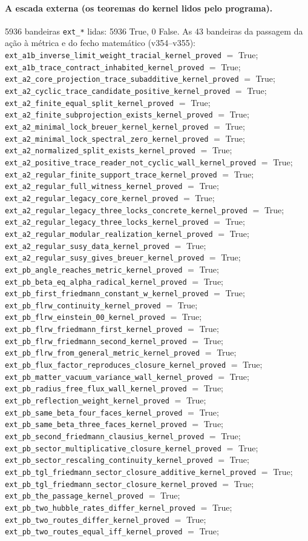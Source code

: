 \documentclass[11pt]{article}
\theoremstyle{definition}\newtheorem{deriv}{Derivação}
\begin{document}
\paragraph*{A escada externa (os teoremas do kernel lidos pelo programa).} 5936 bandeiras \texttt{ext\_*} lidas: 5936 True, 0 False. As 43 bandeiras da passagem da ação à métrica e do fecho matemático (v354--v355): \texttt{ext\_a1b\_inverse\_limit\_weight\_tracial\_kernel\_proved} $=$ True; \texttt{ext\_a1b\_trace\_contract\_inhabited\_kernel\_proved} $=$ True; \texttt{ext\_a2\_core\_projection\_trace\_subadditive\_kernel\_proved} $=$ True; \texttt{ext\_a2\_cyclic\_trace\_candidate\_positive\_kernel\_proved} $=$ True; \texttt{ext\_a2\_finite\_equal\_split\_kernel\_proved} $=$ True; \texttt{ext\_a2\_finite\_subprojection\_exists\_kernel\_proved} $=$ True; \texttt{ext\_a2\_minimal\_lock\_breuer\_kernel\_kernel\_proved} $=$ True; \texttt{ext\_a2\_minimal\_lock\_spectral\_zero\_kernel\_proved} $=$ True; \texttt{ext\_a2\_normalized\_split\_exists\_kernel\_proved} $=$ True; \texttt{ext\_a2\_positive\_trace\_reader\_not\_cyclic\_wall\_kernel\_proved} $=$ True; \texttt{ext\_a2\_regular\_finite\_support\_trace\_kernel\_proved} $=$ True; \texttt{ext\_a2\_regular\_full\_witness\_kernel\_proved} $=$ True; \texttt{ext\_a2\_regular\_legacy\_core\_kernel\_proved} $=$ True; \texttt{ext\_a2\_regular\_legacy\_three\_locks\_concrete\_kernel\_proved} $=$ True; \texttt{ext\_a2\_regular\_legacy\_three\_locks\_kernel\_proved} $=$ True; \texttt{ext\_a2\_regular\_modular\_realization\_kernel\_proved} $=$ True; \texttt{ext\_a2\_regular\_susy\_data\_kernel\_proved} $=$ True; \texttt{ext\_a2\_regular\_susy\_gives\_breuer\_kernel\_proved} $=$ True; \texttt{ext\_pb\_angle\_reaches\_metric\_kernel\_proved} $=$ True; \texttt{ext\_pb\_beta\_eq\_alpha\_radical\_kernel\_proved} $=$ True; \texttt{ext\_pb\_first\_friedmann\_constant\_w\_kernel\_proved} $=$ True; \texttt{ext\_pb\_flrw\_continuity\_kernel\_proved} $=$ True; \texttt{ext\_pb\_flrw\_einstein\_00\_kernel\_proved} $=$ True; \texttt{ext\_pb\_flrw\_friedmann\_first\_kernel\_proved} $=$ True; \texttt{ext\_pb\_flrw\_friedmann\_second\_kernel\_proved} $=$ True; \texttt{ext\_pb\_flrw\_from\_general\_metric\_kernel\_proved} $=$ True; \texttt{ext\_pb\_flux\_factor\_reproduces\_closure\_kernel\_proved} $=$ True; \texttt{ext\_pb\_matter\_vacuum\_variance\_wall\_kernel\_proved} $=$ True; \texttt{ext\_pb\_radius\_free\_flux\_wall\_kernel\_proved} $=$ True; \texttt{ext\_pb\_reflection\_weight\_kernel\_proved} $=$ True; \texttt{ext\_pb\_same\_beta\_four\_faces\_kernel\_proved} $=$ True; \texttt{ext\_pb\_same\_beta\_three\_faces\_kernel\_proved} $=$ True; \texttt{ext\_pb\_second\_friedmann\_clausius\_kernel\_proved} $=$ True; \texttt{ext\_pb\_sector\_multiplicative\_closure\_kernel\_proved} $=$ True; \texttt{ext\_pb\_sector\_rescaling\_continuity\_kernel\_proved} $=$ True; \texttt{ext\_pb\_tgl\_friedmann\_sector\_closure\_additive\_kernel\_proved} $=$ True; \texttt{ext\_pb\_tgl\_friedmann\_sector\_closure\_kernel\_proved} $=$ True; \texttt{ext\_pb\_the\_passage\_kernel\_proved} $=$ True; \texttt{ext\_pb\_two\_hubble\_rates\_differ\_kernel\_proved} $=$ True; \texttt{ext\_pb\_two\_routes\_differ\_kernel\_proved} $=$ True; \texttt{ext\_pb\_two\_routes\_equal\_iff\_kernel\_proved} $=$ True; 
\end{document}
